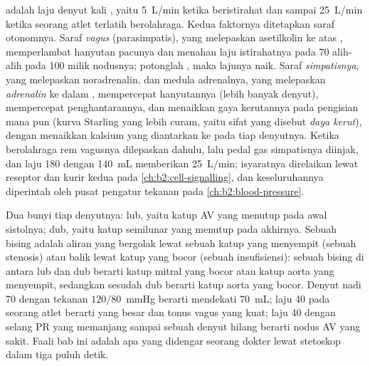 \begin{proposition}\label{prop:b2:heart:control}
 adalah laju denyut kali , yaitu
\qty{5}{L/min} ketika beristirahat dan sampai \qty{25}{L/min} ketika
seorang atlet terlatih berolahraga. Kedua faktornya ditetapkan saraf
otonomnya. Saraf \emph{vagus} (parasimpatis), yang melepaskan
asetilkolin ke atas , memperlambat hanyutan pacunya
dan menahan laju istirahatnya pada 70 alih-alih pada 100 milik
nodusnya; potonglah , maka lajunya naik. Saraf
\emph{simpatisnya}, yang melepaskan noradrenalin, dan medula
adrenalnya, yang melepaskan \emph{adrenalin} ke dalam ,
mempercepat hanyutannya (lebih banyak denyut), mempercepat
penghantarannya, dan menaikkan gaya kerutannya pada pengisian mana pun
(kurva Starling yang lebih curam, yaitu sifat yang disebut \emph{daya
kerut}), dengan menaikkan kalsium yang diantarkan ke  pada
tiap denyutnya. Ketika berolahraga rem vagusnya dilepaskan dahulu, lalu
pedal gas simpatisnya diinjak, dan laju 180 dengan 
\qty{140}{mL} memberikan \qty{25}{L/min}; isyaratnya direlaikan lewat
reseptor dan kurir kedua pada \cref{ch:b2:cell-signalling}, dan
keseluruhannya diperintah oleh pusat pengatur tekanan pada
\cref{ch:b2:blood-pressure}.
\end{proposition}

\begin{example}\label{ex:b2:heart:reading}
Dua bunyi tiap denyutnya: lub, yaitu katup AV yang menutup pada awal
sistolnya; dub, yaitu katup semilunar yang menutup pada akhirnya.
Sebuah bising adalah aliran yang bergolak lewat sebuah katup yang
menyempit (sebuah stenosis) atau balik lewat katup yang bocor (sebuah
insufisiensi): sebuah bising di antara lub dan dub berarti katup mitral
yang bocor atau katup aorta yang menyempit, sedangkan sesudah dub
berarti katup aorta yang bocor. Denyut nadi 70 dengan tekanan 
$120/80$~mmHg berarti  mendekati \qty{70}{mL}; laju 40
pada seorang atlet berarti  yang besar dan tonus vagus
yang kuat; laju 40 dengan selang PR yang memanjang sampai sebuah denyut
hilang berarti nodus AV yang sakit. Faali bab ini adalah apa yang
didengar seorang dokter lewat stetoskop dalam tiga puluh detik.
\end{example}

